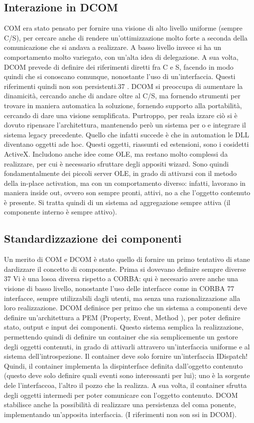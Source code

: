 \subsection{Interazione in DCOM}
COM era stato pensato per fornire una visione di alto livello uniforme (sempre
C/S), per cercare anche di rendere un'ottimizzazione molto forte a seconda
della comunicazione che si andava a realizzare. A basso livello invece si ha un
comportamento molto variegato, con un'alta idea di delegazione.
A sua volta, DCOM prevede di definire dei riferimenti diretti fra C e S,
facendo in modo quindi che si conoscano comunque, nonostante l'uso di un'interfaccia. Questi riferimenti quindi non son
persistenti.37 . DCOM si preoccupa
di aumentare la dinamicità, cercando anche di andare oltre al C/S, ma fornendo
strumenti per trovare in maniera automatica la soluzione, fornendo supporto
alla portabilità, cercando di dare una visione semplificata. Purtroppo, per reala
izzare ciò si è dovuto ripensare l'architettura, mantenendo però un sistema per
o e
integrare il sistema legacy precedente.
Quello che infatti succede è che in automation le DLL diventano oggetti ade
hoc. Questi oggetti, riassunti ed estensioni, sono i cosidetti ActiveX. Includono
anche idee come OLE, ma restano molto complessi da realizzare, per cui è
necessario sfruttare degli appositi wizard. Sono quindi fondamentalmente dei
piccoli server OLE, in grado di attivarsi con il metodo della in-place activation,
ma con un comportamento diverso: infatti, lavorano in maniera inside out,
ovvero son sempre pronti, attivi, no a che l'oggetto contenuto è presente. Si
tratta quindi di un sistema ad aggregazione sempre attiva (il componente interno
è sempre attivo).
\subsection{Standardizzazione dei componenti}
Un merito di COM e DCOM è stato quello di fornire un primo tentativo di stane
dardizzare il concetto di componente. Prima si dovevano definire sempre diverse
37 Vi è una losoa diversa rispetto a CORBA: qui è necesario avere anche una visione di
basso livello, nonostante l'uso delle interfacce come in CORBA
77
interfacce, sempre utilizzabili dagli utenti, ma senza una razionalizzazione alla
loro realizzazione.
DCOM definisce per primo che un sistema a componenti deve definire un'architettura a PEM (Property, Event, Method ), per
poter definire stato, output
e input dei componenti. Questo sistema semplica la realizzazione, permettendo quindi di definire un container che sia
semplicemente un gestore degli oggetti
contenuti, in grado di attivarli attravero un'interfaccia uniforme e al sistema dell'introspezione. Il container deve
solo fornire un'interfaccia IDispatch! Quindi,
il container implementa la dispinterface definita dall'oggetto contenuto (questo
deve solo definire quali eventi sono interessanti per lui); uno è la sorgente dele
l'interfaccoa, l'altro il pozzo che la realizza. A sua volta, il container sfrutta
degli oggetti intermedi per poter comunicare con l'oggetto contenuto.
DCOM stabilisce anche la possibilità di realizzare una persistenza del coma
ponente, implementando un'apposita interfaccia. (I riferimenti non son ssi in
DCOM).
